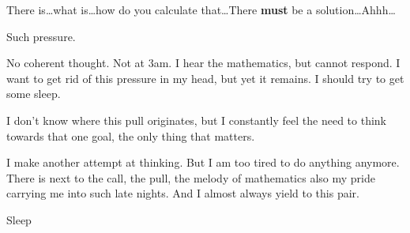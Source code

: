 \documentclass{article}
\title{\vspace{-2cm}\titlevar}
\author{\authorvar}
\date{\datevar}
\newcommand{\fade}{\dots}
\begin{document}
	\maketitle
	
	There is\fade what is\fade how do you calculate that\fade There \textbf{must} be a solution\fade Ahhh\fade
	\begin{center}
		Such pressure.
	\end{center}
	No coherent thought. Not at 3am. I hear the mathematics, but cannot respond. I want to get rid of this pressure in my head, but yet it remains. I should try to get some sleep.
	
	I don't know where this pull originates, but I constantly feel the need to think towards that one goal, the only thing that matters.
	
	I make another attempt at thinking. But I am too tired to do anything anymore. There is next to the call, the pull, the melody of mathematics also my pride carrying me into such late nights. And I almost always yield to this pair.
	
	Sleep
\end{document}
